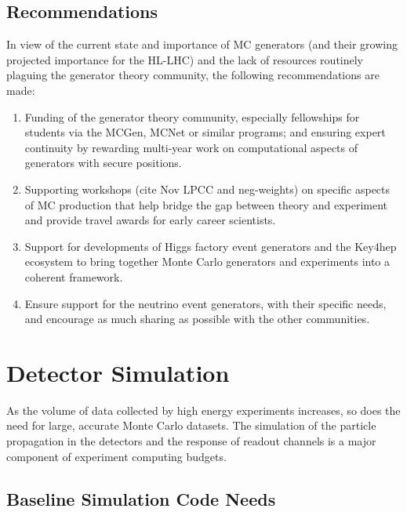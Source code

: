 \documentclass[10pt,a4paper]{article}
\begin{document}
\subsection{Recommendations}\label{recommendations}

In view of the current state and importance of MC generators (and their
growing projected importance for the HL-LHC) and the lack of resources
routinely plaguing the generator theory community, the following
recommendations are made:

\begin{enumerate}
\def\labelenumi{\arabic{enumi}.}
\item
  Funding of the generator theory community, especially fellowships for
  students via the MCGen, MCNet or similar programs; and ensuring expert
  continuity by rewarding multi-year work on computational aspects of
  generators with secure positions.
\item
  Supporting workshops (cite Nov LPCC and neg-weights) on specific
  aspects of MC production that help bridge the gap between theory and
  experiment and provide travel awards for early career scientists.
\item
  Support for developments of Higgs factory event generators and the
  Key4hep ecosystem to bring together Monte Carlo generators and
  experiments into a coherent framework.
\item
  Ensure support for the neutrino event generators, with their specific
  needs, and encourage as much sharing as possible with the other
  communities.
\end{enumerate}

\section{Detector Simulation}\label{detector-simulation}

As the volume of data collected by high energy experiments increases, so
does the need for large, accurate Monte Carlo datasets. The simulation
of the particle propagation in the detectors and the response of readout
channels is a major component of experiment computing budgets.

\subsection{Baseline Simulation Code
Needs}\label{baseline-simulation-code-needs}
\end{document}
